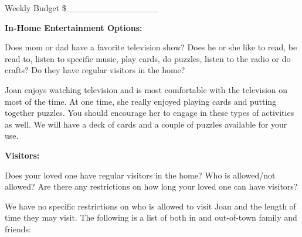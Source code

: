 \documentclass[]{article}
\begin{document}
Weekly Budget \$\_\_\_\_\_\_\_\_\_\_\_\_\_\_\_

\textbf{In-Home Entertainment Options:}

Does mom or dad have a favorite television show? Does he or she like to
read, be read to, listen to specific music, play cards, do puzzles,
listen to the radio or do crafts? Do they have regular visitors in the
home?

Joan enjoys watching television and is most comfortable with the
television on most of the time. At one time, she really enjoyed playing
cards and putting together puzzles. You should encourage her to engage
in these types of activities as well. We will have a deck of cards and a
couple of puzzles available for your use.

\textbf{Visitors:}

Does your loved one have regular visitors in the home? Who is
allowed/not allowed? Are there any restrictions on how long your loved
one can have visitors?

We have no specific restrictions on who is allowed to visit Joan and the
length of time they may visit. The following is a list of both in and
out-of-town family and friends:
\end{document}
